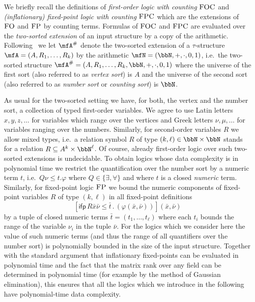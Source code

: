 \documentclass[a4paper,UKenglish]{lipics}
\newcommand{\N}{\ensuremath{\bbN}}
\newcommand{\logic}[1]{\ensuremath{\textsc{#1}}\xspace}
\newcommand{\FO}{\logic{FO}}
\newcommand{\FOC}{\logic{FOC}}
\newcommand{\FP}{\logic{FP}}
\newcommand{\FPC}{\logic{FPC}}
\newcommand{\ifp}{\ensuremath{\textsf{ifp}}\xspace}
\renewcommand{\phi}{\varphi}
\newcommand{\bx}{{\bar x}}
\newcommand{\bnu}{{\bar \nu}}
\theoremstyle{plain}
\begin{document}
We briefly recall the definitions of \emph{first-order logic with 
counting} $\FOC$ and \emph{(inflationary) fixed-point logic with counting} 
$\FPC$ which are the extensions of $\FO$ and $\FP$ by counting terms.
Formulas of $\FOC$ and $\FPC$ are evaluated over 
the \emph{two-sorted extension} of an input structure by a copy of the 
arithmetic. Following~\cite{DaGrHoLa09} we let $\mfA^{\#}$ denote the 
two-sorted extension of a $\tau$-structure $\mfA=(A,R_1,\dots,R_k)$ by the 
arithmetic $\mfN=(\N,+,\cdot,0,1)$, i.e.\ the two-sorted structure $\mfA^{\#} = 
( A, R_1,\dots , R_k , \N, +, \cdot, 0, 1)$ where the universe of the first 
sort (also referred to as \emph{vertex sort}) is $A$ and the universe of the 
second sort (also referred to as \emph{number sort} or \emph{counting sort}) is 
$\N$.

As usual for the two-sorted setting we have,
for both, the vertex and the number sort, a collection of typed
first-order variables. We agree to use Latin letters $x, y, z, \dots$
for variables which range over the vertices and Greek letters $\nu, \mu,
\dots$ for variables ranging over the numbers. 
Similarly, for second-order variables $R$ we allow mixed types, i.e.\ a 
relation symbol $R$ of type $(k , \ell) \in \N \times \N$ stands for a relation 
$R \subseteq A^k \times \N^\ell$. Of course, already first-order logic over 
such 
two-sorted extensions is undecidable. To obtain logics whose 
data complexity is in polynomial time we restrict the quantification over the 
number sort by a numeric term $t$, i.e.\ $Q\nu \leq t . \phi$ where $Q \in \{ 
\exists, \forall \}$ and where $t$ is a closed \emph{numeric} term.
Similarly, for fixed-point logic \FP we bound the numeric components of 
fixed-point variables $R$ of type $(k,\ell)$ in all fixed-point definitions 
\[
 \left[ \ifp \, R\bx\bnu\leq \bar{t} \,.\, (\phi(\bx,\bnu)) \right](\bx,\bnu)
\]
by a tuple of closed numeric terms $\bar{t}=(t_1,\dots,t_\ell)$ where each 
$t_i$ bounds the range of the variable $\nu_i$ in the tuple $\bnu$. 
For the logics which we consider here the value of such 
numeric terms (and thus the range of all quantifiers over the number sort) 
is polynomially bounded in the size of the input structure. Together 
with the standard argument that inflationary fixed-points can be evaluated in 
polynomial time and the fact that the matrix rank over any field can be 
determined in polynomial time (for example by the method of Gaussian 
elimination), this ensures that all the logics which we introduce in the 
following have polynomial-time data complexity.
\end{document}
